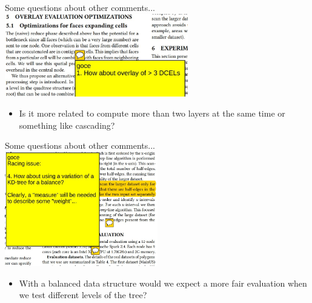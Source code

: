 \documentclass{beamer}
\begin{document}
\begin{frame}{Some questions about other comments...}
  \centering 
  \includegraphics[width=0.6\textwidth]{figures/Q1}
  \begin{itemize}
    \item Is it more related to compute more than two layers at the same time or something like cascading?
  \end{itemize}
\end{frame}

\begin{frame}{Some questions about other comments...}
  \centering 
  \includegraphics[width=0.5\textwidth]{figures/Q2}
  \begin{itemize}
    \item With a balanced data structure would we expect a more fair evaluation when we test different levels of the tree?
  \end{itemize}
\end{frame}

\end{document}
